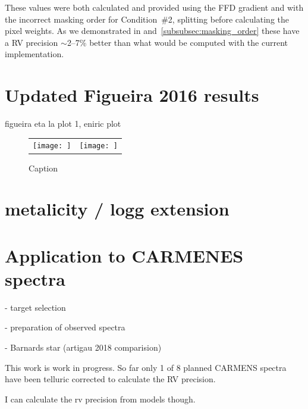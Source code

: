 These values were both calculated and provided using the {FFD} gradient and with the incorrect masking order for Condition~\#2, splitting before calculating the pixel weights. As we demonstrated in  and~\ref{subsubsec:masking_order} these have a {RV} precision \(\sim\)2--7\% better than what would be computed with the current implementation.


\section{ Updated Figueira 2016 results}
 figueira eta la plot 1, eniric plot

\begin{figure}
    \centering
    \begin{tabular}{c|c}
         
    \texttt{[image: ]} &  %
    \texttt{[image: ]} \\ %
    \end{tabular}
    \caption{Caption}
    \label{fig:my_label}
\end{figure}


\section{ metalicity / logg extension}



\section{Application to CARMENES spectra}

- target selection

- preparation of observed spectra

- Barnards star (artigau 2018 comparision)


This work is work in progress. So far only 1 of 8 planned CARMENS spectra have been telluric corrected to calculate the RV precision.

{I can calculate the rv precision from models though.}